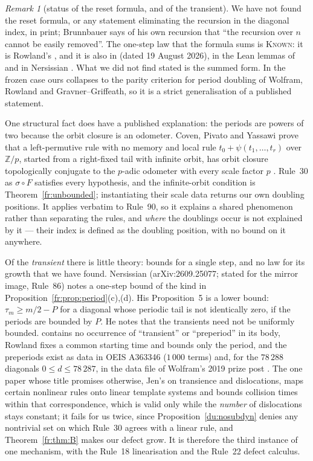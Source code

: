 \documentclass[11pt]{article}
\theoremstyle{definition}
\theoremstyle{remark}
\newtheorem{remark}[theorem]{Remark}
\newcommand{\Z}{\mathbb{Z}}
\newcommand{\KNOWN}{\textsc{Known}}
\begin{document}
\begin{remark}[status of the reset formula, and of the transient]\label{fr:reset:status}
We have not found the reset formula, or any statement eliminating the recursion in the diagonal index,
in print; Brunnbauer \cite{Brunnbauer} says of his own recursion that ``the recursion
over $n$ cannot be easily removed''. The one-step law that the formula sums is \KNOWN: it is Rowland's \cite[Lemma~3]{Rowland}, and it is also in \cite{Pat} (dated 19 August 2026), in the Lean lemmas of \cite{Dib} and in Nersissian \cite{Nersissian}. What we did not find stated is the summed form. In the frozen case ours collapses to the parity criterion for
period doubling of Wolfram, Rowland and Gravner--Griffeath, so it is a strict generalisation of a
published statement.

One structural fact does have a published explanation: the periods are powers of two because the orbit
closure is an odometer. Coven, Pivato and Yassawi prove that a left-permutive rule with no memory and
local rule $t_0+\psi(t_1,\dots,t_r)$ over $\Z/p$, started from a right-fixed tail with infinite orbit,
has orbit closure topologically conjugate to the $p$-adic odometer with every scale factor $p$
\cite[Thm.~4]{CPY}. Rule~30 as $\sigma\circ F$ satisfies every hypothesis, and the infinite-orbit
condition is Theorem~\ref{fr:unbounded}; instantiating their scale data returns our own doubling
positions. It applies verbatim to Rule~90, so it explains a shared phenomenon rather than separating
the rules, and \emph{where} the doublings occur is not explained by it --- their index is defined as the
doubling position, with no bound on it anywhere.

Of the \emph{transient} there is little theory: bounds for a single step, and no law for its growth that we have found. Nersissian \cite{Nersissian} (arXiv:2609.25077; stated for the mirror image, Rule~86) notes a one-step bound of the kind in Proposition~\ref{fr:prop:period}(c),(d). His Proposition~5 is a lower bound: $\tau_m\ge m/2-P$ for a diagonal whose periodic tail is not identically zero, if the periods are bounded by $P$. He notes that the transients need not be uniformly bounded. \cite{GG} contains no occurrence of ``transient'' or
``preperiod'' in its body, Rowland fixes a common starting time and bounds only the period, and the
preperiods exist as data in OEIS A363346 \cite{A363346} ($1\,000$ terms) and, for the $78\,288$ diagonals $0\le d\le78\,287$, in the data file of Wolfram's 2019 prize post \cite{Wolfram19}. The one paper whose title promises otherwise, Jen's on
transience and dislocations, maps certain nonlinear rules onto linear template systems and bounds
collision times within that correspondence, which is valid only while the \emph{number} of dislocations
stays constant; it fails for us twice, since Proposition~\ref{du:nosubdyn} denies any nontrivial set on
which Rule~30 agrees with a linear rule, and Theorem~\ref{fr:thm:B} makes our defect grow. It is
therefore the third instance of one mechanism, with the Rule~18 linearisation and the Rule~22 defect
calculus.


\end{remark}
\end{document}
